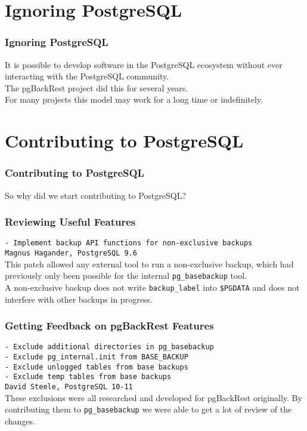 \section{Ignoring PostgreSQL}

\begin{frame}
    \frametitle{Ignoring PostgreSQL}

    It is possible to develop software in the PostgreSQL ecosystem without ever interacting with the PostgreSQL community. \\
    \vspace{1em}
    The pgBackRest project did this for several years. \\
    \vspace{1em}
    For many projects this model may work for a long time or indefinitely.
\end{frame}

\section{Contributing to PostgreSQL}

\begin{frame}
    \frametitle{Contributing to PostgreSQL}

    So why did we start contributing to PostgreSQL?
\end{frame}

\begin{frame}
    \frametitle{Reviewing Useful Features}

    \texttt{- Implement backup API functions for non-exclusive backups} \\
    \texttt{Magnus Hagander, PostgreSQL 9.6} \\
    \vspace{1em}
    This patch allowed any external tool to run a non-exclusive backup, which had previously only been possible for the internal \texttt{pg\_basebackup} tool. \\
    \vspace{1em}
    A non-exclusive backup does not write \texttt{backup\_label} into \texttt{\$PGDATA} and does not interfere with other backups in progress.
\end{frame}

\begin{frame}
    \frametitle{Getting Feedback on pgBackRest Features}

    \texttt{- Exclude additional directories in pg\_basebackup} \\
    \texttt{- Exclude pg\_internal.init from BASE\_BACKUP} \\
    \texttt{- Exclude unlogged tables from base backups} \\
    \texttt{- Exclude temp tables from base backups} \\
    \texttt{David Steele, PostgreSQL 10-11} \\
    \vspace{1em}
    These exclusions were all researched and developed for pgBackRest originally.  By contributing them to \texttt{pg\_basebackup} we were able to get a lot of review of the changes.
\end{frame}

